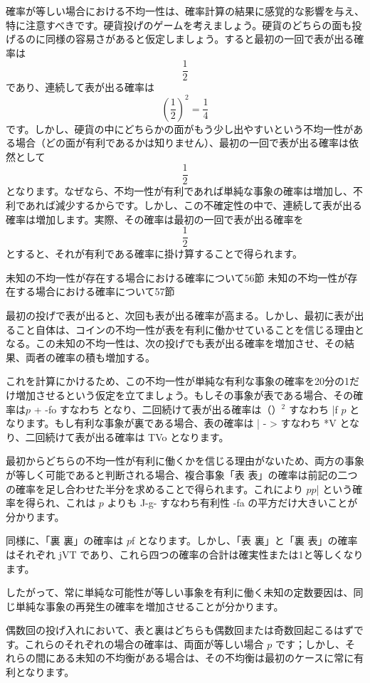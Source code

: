 \documentclass[a4paper,11pt,openany]{ltjsbook}
\begin{document}
確率が等しい場合における不均一性は、確率計算の結果に感覚的な影響を与え、特に注意すべきです。硬貨投げのゲームを考えましょう。硬貨のどちらの面も投げるのに同様の容易さがあると仮定しましょう。すると最初の一回で表が出る確率は$$\frac{1}{2}$$であり、連続して表が出る確率は$$\left(\frac{1}{2}\right)^2 = \frac{1}{4}$$です。しかし、硬貨の中にどちらかの面がもう少し出やすいという不均一性がある場合（どの面が有利であるかは知りません）、最初の一回で表が出る確率は依然として$$\frac{1}{2}$$となります。なぜなら、不均一性が有利であれば単純な事象の確率は増加し、不利であれば減少するからです。しかし、この不確定性の中で、連続して表が出る確率は増加します。実際、その確率は最初の一回で表が出る確率を$$\frac{1}{2}$$とすると、それが有利である確率に掛け算することで得られます。

未知の不均一性が存在する場合における確率について56節
未知の不均一性が存在する場合における確率について57節

最初の投げで表が出ると、次回も表が出る確率が高まる。しかし、最初に表が出ること自体は、コインの不均一性が表を有利に働かせていることを信じる理由となる。この未知の不均一性は、次の投げでも表が出る確率を増加させ、その結果、両者の確率の積も増加する。

これを計算にかけるため、この不均一性が単純な有利な事象の確率を20分の1だけ増加させるという仮定を立てましょう。もしその事象が表である場合、その確率は$p$ + -fo すなわち \pm となり、二回続けて表が出る確率は（\pm）$^2$ すなわち |f $p$ となります。もし有利な事象が裏である場合、表の確率は | - > すなわち *V となり、二回続けて表が出る確率は TVo となります。

最初からどちらの不均一性が有利に働くかを信じる理由がないため、両方の事象が等しく可能であると判断される場合、複合事象「表 表」の確率は前記の二つの確率を足し合わせた半分を求めることで得られます。これにより $p$$p$| という確率を得られ、これは $p$ よりも J-g- すなわち有利性 -fa の平方だけ大きいことが分かります。

同様に、「裏 裏」の確率は $p$f となります。しかし、「表 裏」と「裏 表」の確率はそれぞれ jVT であり、これら四つの確率の合計は確実性または1と等しくなります。

したがって、常に単純な可能性が等しい事象を有利に働く未知の定数要因は、同じ単純な事象の再発生の確率を増加させることが分かります。

偶数回の投げ入れにおいて、表と裏はどちらも偶数回または奇数回起こるはずです。これらのそれぞれの場合の確率は、両面が等しい場合 $p$ です；しかし、それらの間にある未知の不均衡がある場合は、その不均衡は最初のケースに常に有利となります。
\end{document}
